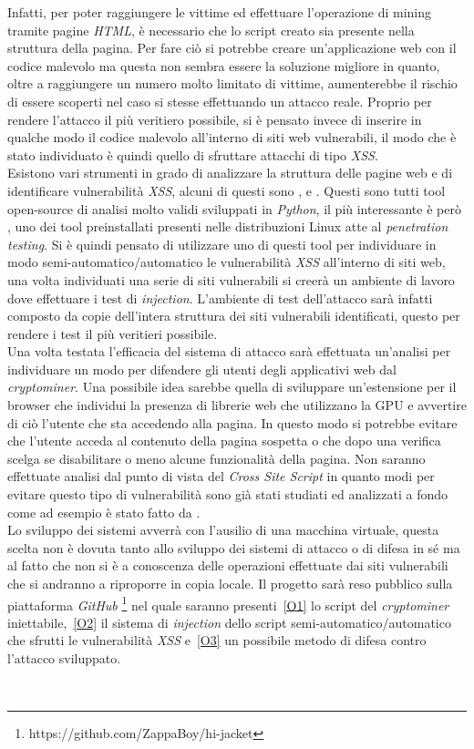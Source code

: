 \documentclass[
11pt, %
oneside, %
italian, %
onehalfspacing,%
headsepline, %
]{MastersDoctoralThesis} %
\newcommand\citen[1]{\citeauthor{#1} \citep{#1}}
\newcommand\citetitlen[1]{\citetitle{#1} \citep{#1}}
\begin{document}
Infatti, per poter raggiungere le vittime ed effettuare l'operazione di mining tramite pagine \emph{HTML}, è necessario che lo script creato sia presente nella struttura della pagina. Per fare ciò si potrebbe creare un'applicazione web con il codice malevolo ma questa non sembra essere la soluzione migliore in quanto, oltre a raggiungere un numero molto limitato di vittime, aumenterebbe il rischio di essere scoperti nel caso si stesse effettuando un attacco reale. Proprio per rendere l'attacco il più veritiero possibile, si è pensato invece di inserire in qualche modo il codice malevolo all'interno di siti web vulnerabili, il modo che è stato individuato è quindi quello di sfruttare attacchi di tipo \emph{XSS}.\\
Esistono vari strumenti in grado di analizzare la struttura delle pagine web e di identificare vulnerabilità \emph{XSS}, alcuni di questi sono \citetitlen{XSStrike}, \citetitlen{Traxss} e \citetitlen{XSSer}. Questi sono tutti tool open-source di analisi molto validi sviluppati in \emph{Python}, il più interessante è però , uno dei tool preinstallati presenti nelle distribuzioni Linux atte al \emph{penetration testing}. Si è quindi pensato di utilizzare uno di questi tool per individuare in modo semi-automatico/automatico le vulnerabilità \emph{XSS} all'interno di siti web, una volta individuati una serie di siti vulnerabili si creerà un ambiente di lavoro dove effettuare i test di \emph{injection}. L'ambiente di test dell'attacco sarà infatti composto da copie dell'intera struttura dei siti vulnerabili identificati, questo per rendere i test il più veritieri possibile.\\
Una volta testata l'efficacia del sistema di attacco sarà effettuata un'analisi per individuare un modo per difendere gli utenti degli applicativi web dal \emph{cryptominer}. Una possibile idea sarebbe quella di sviluppare un'estensione per il browser che individui la presenza di librerie web che utilizzano la GPU e avvertire di ciò l'utente che sta accedendo alla pagina. In questo modo si potrebbe evitare che l'utente acceda al contenuto della pagina sospetta o che dopo una verifica scelga se disabilitare o meno alcune funzionalità della pagina. Non saranno effettuate analisi dal punto di vista del \emph{Cross Site Script} in quanto modi per evitare questo tipo di vulnerabilità sono già stati studiati ed analizzati a fondo come ad esempio è stato fatto da \citen{bisht2008xss}.\\
Lo sviluppo dei sistemi avverrà con l'ausilio di una macchina virtuale, questa scelta non è dovuta tanto allo sviluppo dei sistemi di attacco o di difesa in sé ma al fatto che non si è a conoscenza delle operazioni effettuate dai siti vulnerabili che si andranno a riproporre in copia locale. Il progetto sarà reso pubblico sulla piattaforma \emph{GitHub} \footnote{https://github.com/ZappaBoy/hi-jacket} nel quale saranno presenti~\ref{O1} lo script del \emph{cryptominer} iniettabile,~\ref{O2} il sistema di \emph{injection} dello script semi-automatico/automatico che sfrutti le vulnerabilità \emph{XSS} e~\ref{O3} un possibile metodo di difesa contro l'attacco sviluppato.


\printbibliography\
\end{document}

